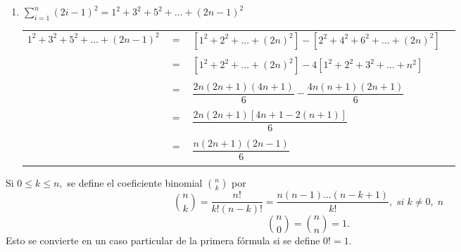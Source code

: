 \begin{enumerate}
\begin{enumerate}[\bfseries (i)]
\item $\displaystyle\sum_{i=1}^{n} (2i-1)^2 = 1^2 + 3^2 + 5^2 + ... + (2n-1)^2$
\begin{center}
\begin{tabular}{r c l l}
$1^2 + 3^2 + 5^2 + ... + (2n-1)^2$&$=$&$\left[ 1^2 +2^2 +...+(2n)^2 \right] - \left[ 2^2 + 4^2 +6^2 +...+ (2n)^2\right]$&\\\\
&$=$&$\left[ 1^2 + 2^2 + ...+ (2n)^2 \right] - 4\left[ 1^2 + 2^2 +3^2 + ... + n^2 \right]$&\\\\
&$=$&$\dfrac{2n(2n+1)(4n+1)}{6} -\dfrac{4n(n+1)(2n+1)}{6}$&\\\\
&$=$&$\dfrac{2n(2n+1)\left[ 4n+1 -2 (n+1) \right]}{6}$&\\\\
&$=$&$\dfrac{n(2n+1)(2n-1)}{6}$&\\\\
\end{tabular}
\end{center}
\end{enumerate}

\begin{tcolorbox}[colback=white]
\begin{def.}
Si $0 \leq k \leq n,$ se define el coeficiente binomial $ {n \choose k} $ por $${n \choose k} = \dfrac{n!}{k!(n-k)!}=\dfrac{n(n-1)...(n - k + 1)}{k!}, \; si \; k \neq 0, \; n$$ $${n \choose 0} = {n \choose n} = 1.$$ Esto se convierte en un caso particular de la primera fórmula si se define $0! = 1.$
\end{def.}
\end{tcolorbox}


\end{enumerate}
